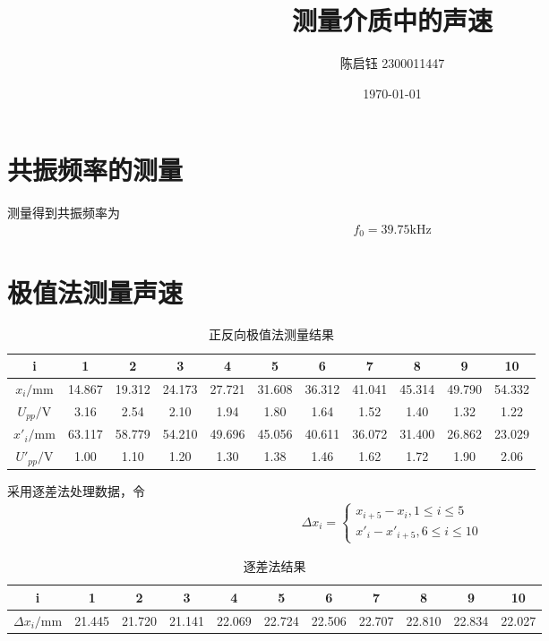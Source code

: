 \documentclass[a4paper]{ctexart}
\title{测量介质中的声速}
\author{陈启钰\,\,2300011447}
\date{\today}
\begin{document}
	\maketitle
	\tableofcontents
	\newpage
	\section{共振频率的测量}
	测量得到共振频率为
	\begin{align}
		f_0=39.75\mathrm{kHz}
	\end{align}
	\section{极值法测量声速}
	\begin{table}[H]
		\begin{center}
			\caption{正反向极值法测量结果}
			\begin{tabular}{c|cccccccccc}
				i&1&2&3&4&5&6&7&8&9&10\\
				\hline
				$x_i/\mathrm{mm}$&14.867&19.312&24.173&27.721&31.608&36.312&41.041&45.314&49.790&54.332\\
				\hline
				$U_{pp}/\mathrm{V}$&3.16&2.54&2.10&1.94&1.80&1.64&1.52&1.40&1.32&1.22\\
				\hline
				$x'_i/\mathrm{mm}$&63.117&58.779&54.210&49.696&45.056&40.611&36.072&31.400&26.862&23.029\\
				\hline
				$U'_{pp}/\mathrm{V}$&1.00&1.10&1.20&1.30&1.38&1.46&1.62&1.72&1.90&2.06
			\end{tabular}
		\end{center}
	\end{table}
	采用逐差法处理数据，令
	\begin{align}
		\Delta x_i=\begin{cases}
			x_{i+5}-x_{i}, 1\le i\le 5\\
			x'_{i}-x'_{i+5}, 6\le i\le 10
		\end{cases}
	\end{align}
	\begin{table}[H]
		\begin{center}
			\caption{逐差法结果}
			\begin{tabular}{c|cccccccccc}
				i&1&2&3&4&5&6&7&8&9&10\\
				\hline
				$\Delta x_i/\mathrm{mm}$&21.445&21.720&21.141&22.069&22.724&22.506&22.707&22.810&22.834&22.027				
			\end{tabular}
		\end{center}
	\end{table}
\end{document}
